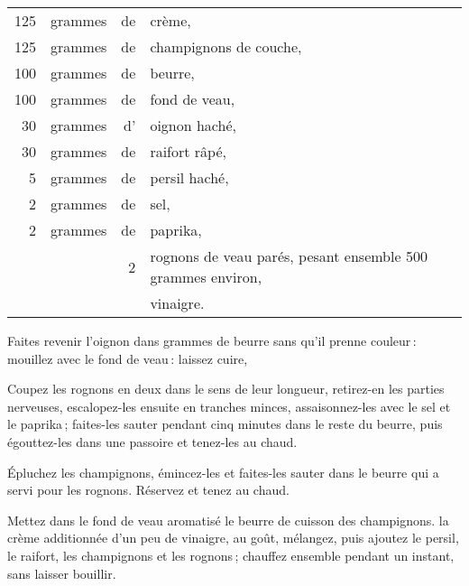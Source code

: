 \medskip

\footnotesize
\begin{longtable}{rrrp{18em}}
    125 & grammes & de & crème,                                                                           \\
    125 & grammes & de & champignons de couche,                                                           \\
    100 & grammes & de & beurre,                                                                          \\
    100 & grammes & de & fond de veau,                                                                    \\
     30 & grammes & d’ & oignon haché,                                                                    \\
     30 & grammes & de & raifort râpé,                                                                    \\
      5 & grammes & de & persil haché,                                                                    \\
      2 & grammes & de & sel,                                                                             \\
      2 & grammes & de & paprika,                                                                         \\
        &         &  2 & rognons de veau parés, pesant ensemble 500 grammes environ,                      \\
        &         &    & vinaigre.                                                                        \\
\end{longtable}
\normalsize

Faites revenir l'oignon dans {\mmm} grammes de beurre sans qu'il prenne couleur :
mouillez avec le fond de veau : laissez cuire,

Coupez les rognons en deux dans le sens de leur longueur, retirez-en les parties
nerveuses, escalopez-les ensuite en tranches minces, assaisonnez-les avec le sel et
le paprika ; faites-les sauter pendant cinq minutes dans le reste du beurre, puis
égouttez-les dans une passoire et tenez-les au chaud.

Épluchez les champignons, émincez-les et faites-les sauter dans le beurre qui a
servi pour les rognons. Réservez et tenez au chaud.

Mettez dans le fond de veau aromatisé le beurre de cuisson des champignons. la
crème additionnée d'un peu de vinaigre, au goût, mélangez, puis ajoutez le
persil, le raifort, les champignons et les rognons ; chauffez ensemble pendant
un instant, sans laisser bouillir.

